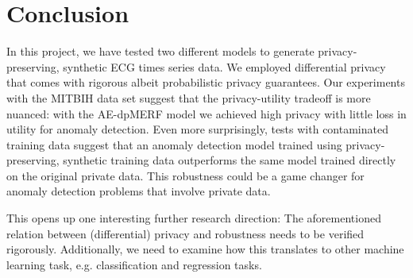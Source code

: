 \section{Conclusion}

In this project, we have tested two different models to generate privacy-preserving, synthetic ECG times series data. We employed differential privacy that comes with rigorous albeit probabilistic privacy guarantees. Our experiments with the MITBIH data set suggest that the privacy-utility tradeoff is more nuanced: with the AE-dpMERF model we achieved high privacy with little loss in utility for anomaly detection. Even more surprisingly, tests with contaminated training data suggest that an anomaly detection model trained using privacy-preserving, synthetic training data outperforms the same model trained directly on the original private data. This robustness could be a game changer for anomaly detection problems that involve private data. 

This opens up one interesting further research direction: The aforementioned relation between (differential) privacy and robustness needs to be verified rigorously. Additionally, we need to examine how this translates to other machine learning task, e.g. classification and regression tasks. 
